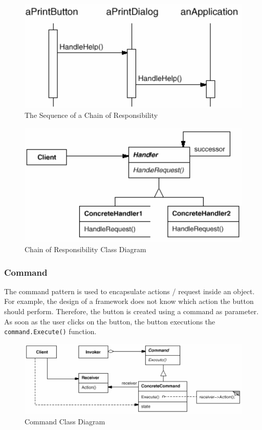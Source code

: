 \documentclass[11pt]{article}
\begin{document}
\begin{figure}[htbp]
\centering
\includegraphics[width=.9\linewidth]{img/chain_of_responsibility_sequence.png}
\caption{\label{fig:the-sequence-of-a-chain-of-responsibility}The Sequence of a Chain of Responsibility}
\end{figure}

\begin{figure}[htbp]
\centering
\includegraphics[width=.9\linewidth]{img/chain_of_responsibility.png}
\caption{\label{fig:chain-of-responsibility-class-diagram}Chain of Responsibility Class Diagram}
\end{figure}

\subsubsection{Command}
\label{sec:org4260500}
The command pattern is used to encapsulate actions / request inside an object.
For example, the design of a framework does not know which action the button should perform.
Therefore, the button is created using a command as parameter.
As soon as the user clicks on the button, the button executions the \texttt{command.Execute()} function.

\begin{figure}[htbp]
\centering
\includegraphics[width=.9\linewidth]{img/command.png}
\caption{\label{fig:command-class-diagram}Command Class Diagram}
\end{figure}
\end{document}
